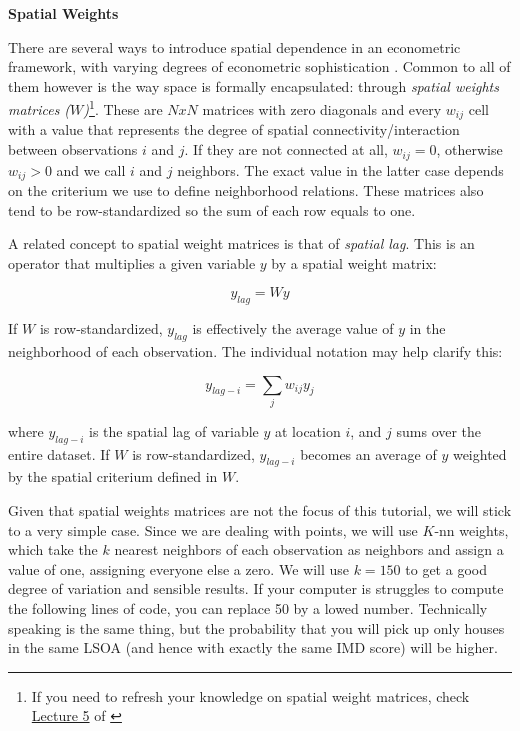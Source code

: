 \documentclass[]{book}
\begin{document}
\textbf{Spatial Weights}

There are several ways to introduce spatial dependence in an econometric
framework, with varying degrees of econometric sophistication
\citep[see][ for a good overview]{anselin2003spatial}. Common to all of
them however is the way space is formally encapsulated: through
\emph{spatial weights matrices (\(W\))}\footnote{If you need to refresh
  your knowledge on spatial weight matrices, check
  \href{http://darribas.org/gds15/notes/Class_05.html}{Lecture 5} of
  \citet{darribas_gds15}}. These are \(NxN\) matrices with zero
diagonals and every \(w_{ij}\) cell with a value that represents the
degree of spatial connectivity/interaction between observations \(i\)
and \(j\). If they are not connected at all, \(w_{ij}=0\), otherwise
\(w_{ij}>0\) and we call \(i\) and \(j\) neighbors. The exact value in
the latter case depends on the criterium we use to define neighborhood
relations. These matrices also tend to be row-standardized so the sum of
each row equals to one.

A related concept to spatial weight matrices is that of \emph{spatial
lag}. This is an operator that multiplies a given variable \(y\) by a
spatial weight matrix:

\[
y_{lag} = W y
\]

If \(W\) is row-standardized, \(y_{lag}\) is effectively the average
value of \(y\) in the neighborhood of each observation. The individual
notation may help clarify this:

\[
y_{lag-i} = \displaystyle \sum_j w_{ij} y_j
\]

where \(y_{lag-i}\) is the spatial lag of variable \(y\) at location
\(i\), and \(j\) sums over the entire dataset. If \(W\) is
row-standardized, \(y_{lag-i}\) becomes an average of \(y\) weighted by
the spatial criterium defined in \(W\).

Given that spatial weights matrices are not the focus of this tutorial,
we will stick to a very simple case. Since we are dealing with points,
we will use \(K\)-nn weights, which take the \(k\) nearest neighbors of
each observation as neighbors and assign a value of one, assigning
everyone else a zero. We will use \(k=150\) to get a good degree of
variation and sensible results. If your computer is struggles to compute
the following lines of code, you can replace 50 by a lowed number.
Technically speaking is the same thing, but the probability that you
will pick up only houses in the same LSOA (and hence with exactly the
same IMD score) will be higher.
\end{document}
